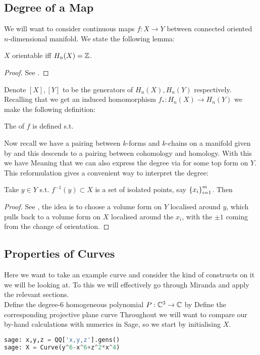 \documentclass{article}
\begin{document}
\subsection{Degree of a Map}
We will want to consider continuous maps $f:X \to Y$ between connected oriented $n$-dimensional manifold. We state the following lemma:
\begin{lemma}
	$X$ orientable iff $H_n(X) = \mathbb{Z}$. 
\end{lemma}
\begin{proof}
	See \cite{Hatcher2002}.
\end{proof}
Denote $[X], [Y]$ to be the generators of $H_n(X), H_n(Y)$ respectively. Recalling that we get an induced homomorphism $f_\ast : H_n(X) \to H_n(Y)$ we make the following definition:
\begin{definition}
	The  of $f$ is defined s.t. 
\end{definition}
Now recall we have a pairing between $k$-forms and $k$-chains on a manifold given by 
and this descends to a pairing between cohomology and homology. With this we have 
Meaning that we can also express the degree via 
for some top form on $Y$. This reformulation gives a convenient way to interpret the degree:
\begin{prop}
	Take $y \in Y$ s.t. $f^{-1}(y) \subset X$ is a set of isolated points, say $\left\{ x_i \right\}_{i=1}^m$. Then 
\end{prop}
\begin{proof}
	See \cite{Manton2004}, the idea is to choose a volume form on $Y$ localised around $y$, which pulls back to a volume form on $X$ localised around the $x_i$, with the $\pm1$ coming from the change of orientation. 
\end{proof}
\subsection{Properties of Curves}
Here we want to take an example curve and consider the kind of constructs on it we will be looking at. To this we will effectively go through Miranda \cite{Miranda1995} and apply the relevant sections. \\
Define the degree-$6$ homogeneous polynomial $P:\mathbb{C}^3 \to \mathbb{C}$ by 
Define the corresponding projective plane curve 
Throughout we will want to compare our by-hand calculations with numerics in Sage, so we start by initialising $X$. 
\begin{lstlisting}[language=Python,frame=single]
sage: x,y,z = QQ['x,y,z'].gens()
sage: X = Curve(y^6-x^6+z^2*x^4)
\end{lstlisting}
\end{document}
